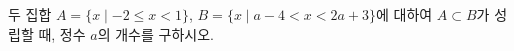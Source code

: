 두 집합 $A=\{x \mid -2\le x<1\}$, $B=\{x \mid a-4<x<2a+3\}$에 대하여 $A\subset B$가 성립할 때, 정수 $a$의 개수를 구하시오.
